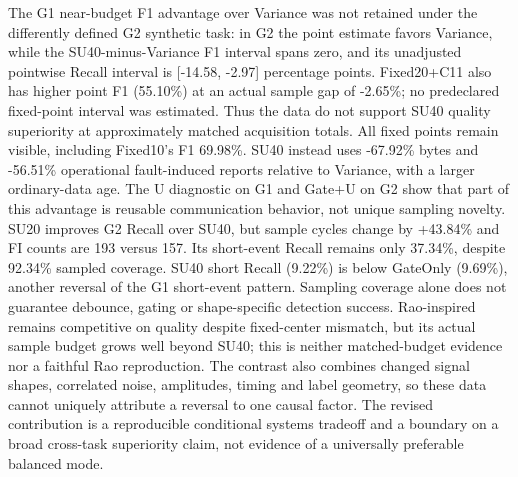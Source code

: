 The G1 near-budget F1 advantage over Variance was not retained under the differently defined G2 synthetic task: in G2 the point estimate favors Variance, while the SU40-minus-Variance F1 interval spans zero, and its unadjusted pointwise Recall interval is [-14.58, -2.97] percentage points. Fixed20+C11 also has higher point F1 (55.10\%) at an actual sample gap of -2.65\%; no predeclared fixed-point interval was estimated. Thus the data do not support SU40 quality superiority at approximately matched acquisition totals. All fixed points remain visible, including Fixed10's F1 69.98\%. SU40 instead uses -67.92\% bytes and -56.51\% operational fault-induced reports relative to Variance, with a larger ordinary-data age. The U diagnostic on G1 and Gate+U on G2 show that part of this advantage is reusable communication behavior, not unique sampling novelty. SU20 improves G2 Recall over SU40, but sample cycles change by +43.84\% and FI counts are 193 versus 157. Its short-event Recall remains only 37.34\%, despite 92.34\% sampled coverage. SU40 short Recall (9.22\%) is below GateOnly (9.69\%), another reversal of the G1 short-event pattern. Sampling coverage alone does not guarantee debounce, gating or shape-specific detection success. Rao-inspired remains competitive on quality despite fixed-center mismatch, but its actual sample budget grows well beyond SU40; this is neither matched-budget evidence nor a faithful Rao reproduction. The contrast also combines changed signal shapes, correlated noise, amplitudes, timing and label geometry, so these data cannot uniquely attribute a reversal to one causal factor. The revised contribution is a reproducible conditional systems tradeoff and a boundary on a broad cross-task superiority claim, not evidence of a universally preferable balanced mode.
